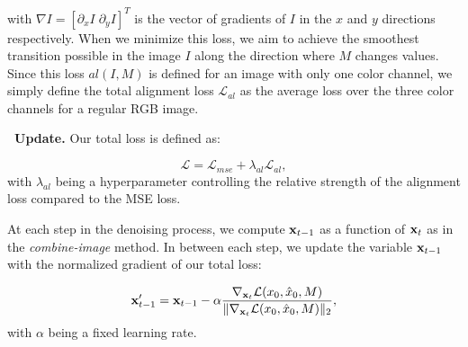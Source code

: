 


\noindent with $\nabla I = [\partial_x I \; \partial_y I]^T$ is the vector of gradients of $I$ in the $x$ and $y$ directions respectively. 
When we minimize this loss, we aim to achieve the smoothest transition possible in the image $I$ along the direction where $M$ changes values. 
Since this loss $al(I, M)$  is defined for an image with only one color channel, we simply define the total alignment loss $\mathcal{L}_{al}$ as the average loss over the three color channels for a regular RGB image.


\noindent \textbf{\acro ~Update.} Our total loss is defined as:

\begin{equation}
\mathcal{L} = \mathcal{L}_{mse} + \lambda_{al} \mathcal{L}_{al},
\end{equation}
with $\lambda_{al}$ being a hyperparameter controlling the relative strength of the alignment loss compared to the MSE loss.





At each step in the denoising process, we compute $\mathbf{x}_{t-1}$ as a function of $\mathbf{x}_t$ as in the \textit{combine-image} method. In between each step, we update the variable $\mathbf{x}_{t-1}$ with the normalized gradient of our total loss:

\begin{equation}
\mathbf{x}_{t-1}' = \mathbf{x}_{t-1} - \alpha \frac{\nabla_{\mathbf{x}_t}\mathcal{L}(x_0, \hat{x}_0, M)}{\Vert \nabla_{\mathbf{x}_t}\mathcal{L}(x_0, \hat{x}_0, M) \Vert_2},
\end{equation}
with $\alpha$ being a fixed learning rate.




